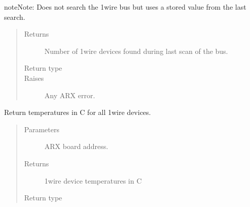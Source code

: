 \documentclass[letterpaper,10pt,english]{sphinxmanual}
\begin{document}
\begin{fulllineitems}
\begin{fulllineitems}
\begin{quote}
\begin{description}
\end{description}\end{quote}

\begin{sphinxadmonition}{note}{Note:}
Does not search the 1wire bus but uses a stored value from
the last search.
\end{sphinxadmonition}
\begin{quote}\begin{description}
\item[{Returns}] \leavevmode
Number of 1wire devices found during last scan of the bus.

\item[{Return type}] \leavevmode
{}

\item[{Raises}] \leavevmode
{} \textendash{} Any ARX error.

\end{description}\end{quote}




{\hyperref[\detokenize{index:lwautils.lwa_arx.ARX.search_1wire}]{}}



\end{fulllineitems}


\begin{fulllineitems}
\label{\detokenize{index:lwautils.lwa_arx.ARX.get_1wire_temp}}
Return temperatures in C for all 1wire devices.
\begin{quote}\begin{description}
\item[{Parameters}] \leavevmode
{} \textendash{} ARX board address.

\item[{Returns}] \leavevmode
1wire device temperatures in C

\item[{Return type}] \leavevmode
{}


\end{description}
\end{quote}
\end{fulllineitems}
\end{fulllineitems}
\end{document}

